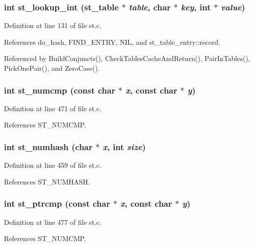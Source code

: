 \subsubsection{\setlength{\rightskip}{0pt plus 5cm}int st\_\-lookup\_\-int (\bf{st\_\-table} $\ast$ {\em table}, char $\ast$ {\em key}, int $\ast$ {\em value})}\label{st_8c_c88c6483b7dce1532154a3a0d662b6f3}




Definition at line 131 of file st.c.

References do\_\-hash, FIND\_\-ENTRY, NIL, and st\_\-table\_\-entry::record.

Referenced by Build\-Conjuncts(), Check\-Tables\-Cache\-And\-Return(), Pair\-In\-Tables(), Pick\-One\-Pair(), and Zero\-Case().
\subsubsection{\setlength{\rightskip}{0pt plus 5cm}int st\_\-numcmp (const char $\ast$ {\em x}, const char $\ast$ {\em y})}\label{st_8c_0ba60ae98aae8e6dd21bbe3b485bcfbe}




Definition at line 471 of file st.c.

References ST\_\-NUMCMP.
\subsubsection{\setlength{\rightskip}{0pt plus 5cm}int st\_\-numhash (char $\ast$ {\em x}, int {\em size})}\label{st_8c_ede320ef4713f295a335b4da6e1d8358}




Definition at line 459 of file st.c.

References ST\_\-NUMHASH.
\subsubsection{\setlength{\rightskip}{0pt plus 5cm}int st\_\-ptrcmp (const char $\ast$ {\em x}, const char $\ast$ {\em y})}\label{st_8c_52bf6e577a2a87b2cdedb1c3d0e25075}




Definition at line 477 of file st.c.

References ST\_\-NUMCMP.

